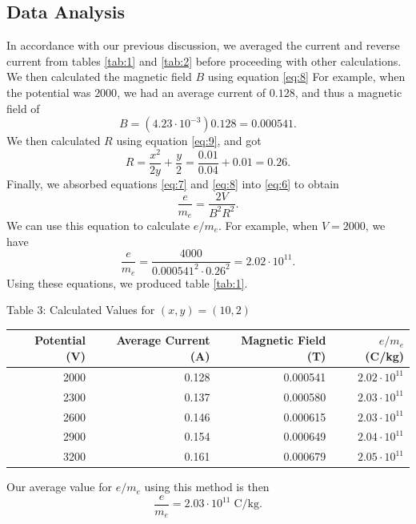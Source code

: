 \documentclass[11pt, letterpaper]{report}
\begin{document}
\subsection{Data Analysis}
In accordance with our previous discussion, we averaged the current and reverse current from tables \ref{tab:1} and \ref{tab:2} before proceeding with other calculations. We then calculated the magnetic field $B$ using equation \ref{eq:8} For example, when the potential was $2000$, we had an average current of $0.128$, and thus a magnetic field of
\[
	B=\left( 4.23\cdot 10^{-3} \right) 0.128=0.000541
.\]
We then calculated $R$ using equation \ref{eq:9}, and got
\[
	R=\frac{x^2}{2y}+\frac{y}{2}=\frac{0.01}{0.04}+0.01=0.26
.\]
Finally, we absorbed equations \ref{eq:7} and \ref{eq:8} into \ref{eq:6} to obtain
\begin{equation}\label{eq:10}
	\frac{e}{m_e}=\frac{2V}{B^2R^2}
.\end{equation}
We can use this equation to calculate $e /m_e$. For example, when $V=2000$, we have
\[
	\frac{e}{m_e}=\frac{4000}{0.000541^2\cdot 0.26^2}=2.02\cdot 10^{11}
.\]
Using these equations, we produced table \ref{tab:1}.
\begin{center}
	Table 3: Calculated Values for $(x,y)=(10,2)$\label{tab:3}\vspace{5pt}\\
	\begin{tabular}{rrrr}
		\toprule
		Potential (V)&Average Current (A)&Magnetic Field (T)&$e /m_e$ (C/kg)\\
		\midrule
		2000&0.128&0.000541&$2.02\cdot 10^{11}$\\
		2300&0.137&0.000580&$2.03\cdot 10^{11}$\\
		2600&0.146&0.000615&$2.03\cdot 10^{11}$\\
		2900&0.154&0.000649&$2.04\cdot 10^{11}$ \\
		3200&0.161&0.000679&$2.05\cdot 10^{11}$ \\
		\bottomrule
	\end{tabular}
\end{center}
Our average value for $e /m_e$ using this method is then
\[
	\frac{e}{m_e}=2.03\cdot 10^{11}\; \text{C/kg}
.\]
\end{document}

